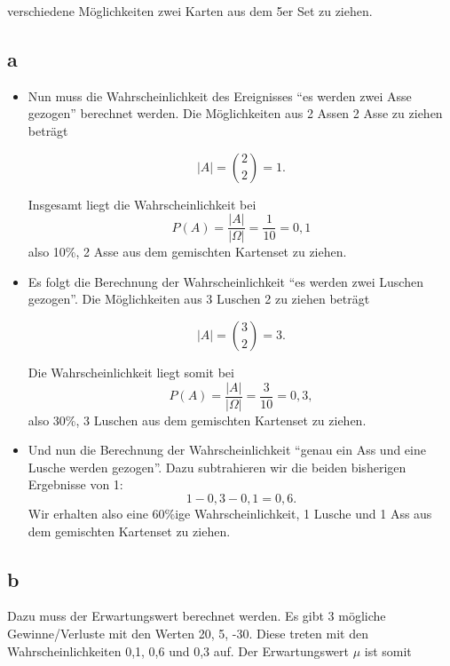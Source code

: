 \documentclass[12pt]{article}
\begin{document}
verschiedene Möglichkeiten zwei Karten aus dem 5er Set zu ziehen.

\subsection*{a}
\begin{itemize}
    \item Nun muss die Wahrscheinlichkeit des Ereignisses "`es werden zwei Asse gezogen"' berechnet 
    werden. Die Möglichkeiten aus 2 Assen 2 Asse zu ziehen beträgt
    
    \begin{equation*}
    |A| = \binom{2}{2} = 1.
    \end{equation*}

    Insgesamt liegt die Wahrscheinlichkeit bei
    \begin{equation*}
    P(A) = \frac{|A|}{| \Omega |} = \frac{1}{10} = 0,1
    \end{equation*}
    also 10\%, 2 Asse aus dem gemischten Kartenset zu ziehen.

    \item Es folgt die Berechnung der Wahrscheinlichkeit "`es werden zwei Luschen gezogen"'.
    Die Möglichkeiten aus 3 Luschen 2 zu ziehen beträgt

    \begin{equation*}
    |A| = \binom{3}{2} = 3.
    \end{equation*}

    Die Wahrscheinlichkeit liegt somit bei
    \begin{equation*}
    P(A) = \frac{|A|}{| \Omega |} = \frac{3}{10} = 0,3,
    \end{equation*}
    also 30\%, 3 Luschen aus dem gemischten Kartenset zu ziehen.

    \item Und nun die Berechnung der Wahrscheinlichkeit "`genau ein Ass und eine Lusche werden gezogen"'.
    Dazu subtrahieren wir die beiden bisherigen Ergebnisse von 1:
    \begin{equation*}
    1 - 0,3 - 0,1 = 0,6.
    \end{equation*}
    Wir erhalten also eine 60\%ige Wahrscheinlichkeit, 1 Lusche und 1 Ass aus dem gemischten Kartenset zu ziehen.

\end{itemize}

\subsection*{b}
Dazu muss der Erwartungswert berechnet werden. Es gibt 3 mögliche Gewinne/Verluste mit den
Werten 20, 5, -30. Diese treten mit den Wahrscheinlichkeiten 0,1, 0,6 und 0,3 auf. Der 
Erwartungswert $\mu$ ist somit
\end{document}
